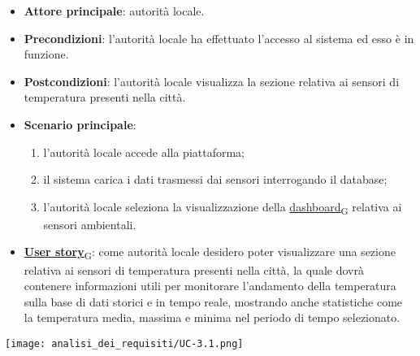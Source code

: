\begin{itemize}
	\item \textbf{Attore principale}: autorità locale.
	\item \textbf{Precondizioni}: l'autorità locale ha effettuato l'accesso al sistema ed esso è in funzione.
	\item \textbf{Postcondizioni}: l'autorità locale visualizza la sezione relativa
	      ai sensori di temperatura presenti nella città.
	\item \textbf{Scenario principale}:
	      \begin{enumerate}
		      \item l'autorità locale accede alla piattaforma;
		      \item il sistema carica i dati trasmessi dai sensori interrogando il database;
		      \item l'autorità locale seleziona la visualizzazione della \href{https://7last.github.io/docs/pb/documentazione-interna/glossario\#dashboard}{dashboard\textsubscript{G}} relativa ai sensori ambientali.
	      \end{enumerate}
	\item \href{https://7last.github.io/docs/pb/documentazione-interna/glossario\#user-story}{\textbf{User story}\textsubscript{G}}:
	      come autorità locale desidero poter visualizzare una sezione relativa ai sensori di temperatura presenti nella città, la quale
	      dovrà contenere informazioni utili per monitorare l'andamento della temperatura sulla base di dati storici e in tempo reale, mostrando
	      anche statistiche come la temperatura media, massima e minima nel periodo di tempo selezionato.
\end{itemize}
\begin{center}
	\texttt{[image: analisi\_dei\_requisiti/UC-3.1.png]}
\end{center}


